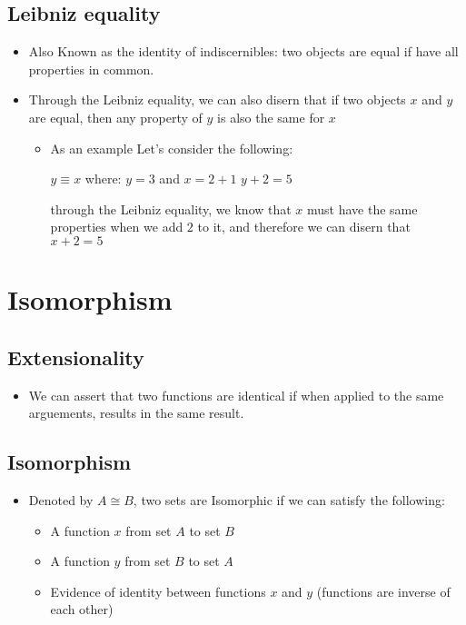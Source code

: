 \documentclass{lecturenotes}
\begin{document}
\subsection*{Leibniz equality}
\begin{itemize}
    \item Also Known as the identity of indiscernibles: two objects are equal if have all properties in common.
    \item Through the Leibniz equality, we can also disern that if two objects $x$ and $y$ are equal, then any
    \newline property of $y$ is also the same for $x$
    \begin{itemize}
        \item As an example Let's consider the following:
        \begin{center}
            $y \equiv x$ where: \newline
            $y = 3$ and \newline
            $x = 2 + 1$ \newline
            $y + 2 = 5$ \newline
        \end{center}
        through the Leibniz equality, we know that $x$ must have the same properties when we add $2$ to it, \newline
        and therefore we can disern that $x + 2 = 5$ 
    \end{itemize}
\end{itemize}

\section{Isomorphism}
\label{sec:Isomorphism}
\subsection*{Extensionality}
\begin{itemize}
    \item We can assert that two functions are identical if when applied to the same arguements, results in the same result.
\end{itemize}
\subsection*{Isomorphism}
\begin{itemize}
    \item Denoted by $A \cong B$, two sets are Isomorphic if we can satisfy the following:
    \begin{itemize}
        \item A function $x$ from set $A$ to set $B$
        \item A function $y$ from set $B$ to set $A$
        \item Evidence of identity between functions $x$ and $y$ (functions are inverse of each other)
    \end{itemize}
\end{itemize}
\end{document}
